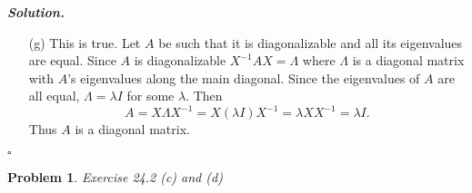 \documentclass[12pt]{report}
\newtheorem{problem}{Problem}
\newenvironment{solution}[1][\it{Solution}]{\textbf{#1. } }{$\square$}
\begin{document}
\begin{solution}
\begin{enumerate}
        \item [(g)]
        This is true. Let $A$ be such that it is diagonalizable and all its eigenvalues are equal. Since $A$ is diagonalizable $X^{-1}AX = \Lambda$ where $\Lambda$ is a diagonal matrix with $A$'s eigenvalues along the main diagonal. Since the eigenvalues of $A$ are all equal, $\Lambda = \lambda I$ for some $\lambda$. Then
        \[ A = X\Lambda X^{-1} = X(\lambda I)X^{-1} = \lambda XX^{-1} = \lambda I.\]
        Thus $A$ is a diagonal matrix. 

    \end{enumerate}
\end{solution}

\newpage



\begin{problem}
    Exercise 24.2 (c) and (d) 
\end{problem}
\end{document}
